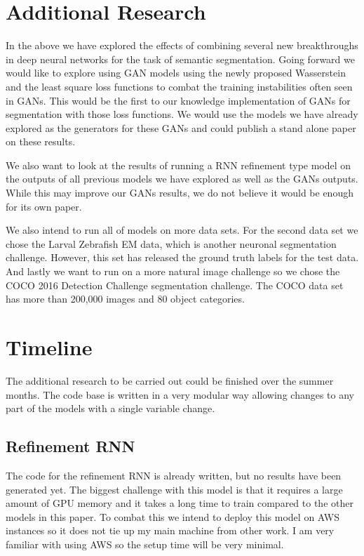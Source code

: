 \chapter{Additional Research}
In the above we have explored the effects of combining several new breakthroughs in deep neural networks for the task of semantic segmentation. Going forward we would like to explore using GAN models using the newly proposed Wasserstein and the least square loss functions to combat the training instabilities often seen in GANs. This would be the first to our knowledge implementation of GANs for segmentation with those loss functions. We would use the models we have already explored as the generators for these GANs and could publish a stand alone paper on these results.

We also want to look at the results of running a RNN refinement type model on the outputs of all previous models we have explored as well as the GANs outputs. While this may improve our GANs results, we do not believe it would be enough for its own paper.

We also intend to run all of models on more data sets. For the second data set we chose the Larval Zebrafish EM data, which is another neuronal segmentation challenge. However, this set has released the ground truth labels for the test data. And lastly we want to run on a more natural image challenge so we chose the COCO 2016 Detection Challenge segmentation challenge. The COCO data set has more than 200,000 images and 80 object categories.


\chapter{Timeline}
The additional research to be carried out could be finished over the summer months. The code base is written in a very modular way allowing changes to any part of the models with a single variable change. 

\section{Refinement RNN}
The code for the refinement RNN is already written, but no results have been generated yet. The biggest challenge with this model is that it requires a large amount of GPU memory and it takes a long time to train compared to the other models in this paper. To combat this we intend to deploy this model on AWS instances so it does not tie up my main machine from other work. I am very familiar with using AWS so the setup time will be very minimal.

